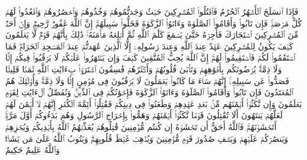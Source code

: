 \stopbuffer%
\startbuffer[\q:9:5]
فَإِذَا ٱنسَلَخَ ٱلۡأَشۡهُرُ ٱلۡحُرُمُ فَٱقۡتُلُوا۟ ٱلۡمُشۡرِكِینَ حَیۡثُ وَجَدتُّمُوهُمۡ وَخُذُوهُمۡ وَٱحۡصُرُوهُمۡ وَٱقۡعُدُوا۟ لَهُمۡ كُلَّ مَرۡصَدࣲۚ فَإِن تَابُوا۟ وَأَقَامُوا۟ ٱلصَّلَوٰةَ وَءَاتَوُا۟ ٱلزَّكَوٰةَ فَخَلُّوا۟ سَبِیلَهُمۡۚ إِنَّ ٱللَّهَ غَفُورࣱ رَّحِیمࣱ%
\stopbuffer%
\startbuffer[\q:9:6]
وَإِنۡ أَحَدࣱ مِّنَ ٱلۡمُشۡرِكِینَ ٱسۡتَجَارَكَ فَأَجِرۡهُ حَتَّىٰ یَسۡمَعَ كَلَٰمَ ٱللَّهِ ثُمَّ أَبۡلِغۡهُ مَأۡمَنَهُۥۚ ذَٰلِكَ بِأَنَّهُمۡ قَوۡمࣱ لَّا یَعۡلَمُونَ%
\stopbuffer%
\startbuffer[\q:9:7]
كَیۡفَ یَكُونُ لِلۡمُشۡرِكِینَ عَهۡدٌ عِندَ ٱللَّهِ وَعِندَ رَسُولِهِۦۤ إِلَّا ٱلَّذِینَ عَٰهَدتُّمۡ عِندَ ٱلۡمَسۡجِدِ ٱلۡحَرَامِۖ فَمَا ٱسۡتَقَٰمُوا۟ لَكُمۡ فَٱسۡتَقِیمُوا۟ لَهُمۡۚ إِنَّ ٱللَّهَ یُحِبُّ ٱلۡمُتَّقِینَ%
\stopbuffer%
\startbuffer[\q:9:8]
كَیۡفَ وَإِن یَظۡهَرُوا۟ عَلَیۡكُمۡ لَا یَرۡقُبُوا۟ فِیكُمۡ إِلࣰّا وَلَا ذِمَّةࣰۚ یُرۡضُونَكُم بِأَفۡوَٰهِهِمۡ وَتَأۡبَىٰ قُلُوبُهُمۡ وَأَكۡثَرُهُمۡ فَٰسِقُونَ%
\stopbuffer%
\startbuffer[\q:9:9]
ٱشۡتَرَوۡا۟ بِءَایَٰتِ ٱللَّهِ ثَمَنࣰا قَلِیلࣰا فَصَدُّوا۟ عَن سَبِیلِهِۦۤۚ إِنَّهُمۡ سَاۤءَ مَا كَانُوا۟ یَعۡمَلُونَ%
\stopbuffer%
\startbuffer[\q:9:10]
لَا یَرۡقُبُونَ فِی مُؤۡمِنٍ إِلࣰّا وَلَا ذِمَّةࣰۚ وَأُو۟لَٰۤئِكَ هُمُ ٱلۡمُعۡتَدُونَ%
\stopbuffer%
\startbuffer[\q:9:11]
فَإِن تَابُوا۟ وَأَقَامُوا۟ ٱلصَّلَوٰةَ وَءَاتَوُا۟ ٱلزَّكَوٰةَ فَإِخۡوَٰنُكُمۡ فِی ٱلدِّینِۗ وَنُفَصِّلُ ٱلۡءَایَٰتِ لِقَوۡمࣲ یَعۡلَمُونَ%
\stopbuffer%
\startbuffer[\q:9:12]
وَإِن نَّكَثُوۤا۟ أَیۡمَٰنَهُم مِّنۢ بَعۡدِ عَهۡدِهِمۡ وَطَعَنُوا۟ فِی دِینِكُمۡ فَقَٰتِلُوۤا۟ أَئِمَّةَ ٱلۡكُفۡرِ إِنَّهُمۡ لَاۤ أَیۡمَٰنَ لَهُمۡ لَعَلَّهُمۡ یَنتَهُونَ%
\stopbuffer%
\startbuffer[\q:9:13]
أَلَا تُقَٰتِلُونَ قَوۡمࣰا نَّكَثُوۤا۟ أَیۡمَٰنَهُمۡ وَهَمُّوا۟ بِإِخۡرَاجِ ٱلرَّسُولِ وَهُم بَدَءُوكُمۡ أَوَّلَ مَرَّةٍۚ أَتَخۡشَوۡنَهُمۡۚ فَٱللَّهُ أَحَقُّ أَن تَخۡشَوۡهُ إِن كُنتُم مُّؤۡمِنِینَ%
\stopbuffer%
\startbuffer[\q:9:14]
قَٰتِلُوهُمۡ یُعَذِّبۡهُمُ ٱللَّهُ بِأَیۡدِیكُمۡ وَیُخۡزِهِمۡ وَیَنصُرۡكُمۡ عَلَیۡهِمۡ وَیَشۡفِ صُدُورَ قَوۡمࣲ مُّؤۡمِنِینَ%
\stopbuffer%
\startbuffer[\q:9:15]
وَیُذۡهِبۡ غَیۡظَ قُلُوبِهِمۡۗ وَیَتُوبُ ٱللَّهُ عَلَىٰ مَن یَشَاۤءُۗ وَٱللَّهُ عَلِیمٌ حَكِیمٌ%
\stopbuffer%

